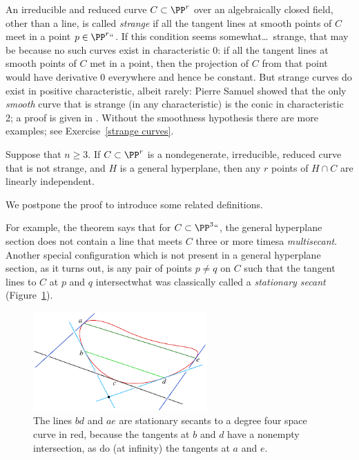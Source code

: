 An irreducible and reduced curve
$C\subset \PP^r$ over an algebraically closed field,
other than a
%
line, is called \emph{strange} if
all the tangent lines at smooth points of $C$ meet in a point $p\in \PP^r``$.
If this condition seems somewhat\dots\ strange, that may be because no
such curves exist in characteristic 0: if
all the
tangent lines at smooth points of $C$ met in a point, then the projection
of $C$ from that point would have derivative 0 everywhere and hence be
constant. But strange curves do exist in
positive
characteristic, albeit
%
rarely: Pierre Samuel showed that the only \emph{smooth} curve that is
strange (in any characteristic) is the conic in
characteristic 2;
%
a proof
is given in \cite[Theorem IV.3.9]{Hartshorne1977}. Without the smoothness
hypothesis there are more examples; see Exercise~\ref{strange curves}.



\begin{npt}
\begin{theorem}
\label{basic linear independence}\label{linear general position}
%
Suppose that $n\geq 3$. If $C\subset \PP^r$ is a nondegenerate,
irreducible, reduced curve
that is not strange,
and $H$ is a general hyperplane, then any $r$ points of $H\cap C$ are
linearly independent.
\unif
\end{theorem}
\end{npt}

We postpone the proof to introduce some related definitions.

For example, the theorem says that for $C \subset \PP^3` `$, the general
hyperplane section does not contain a line
%
that meets $C$ three or more times\emdash a \emph{multisecant}. Another
special configuration which is not present in a general hyperplane
section, as it turns out,
is any pair of points $p\neq q$ on $C$ such that the tangent lines
to $C$ at $p$ and $q$ intersect\emdash what was
classically
%
called a
\textit{stationary secant}
(Figure~\ref{Fig9.1}).

\begin{figure}
\includegraphics[height=1.5in]{main/cradle-good}
\caption{The lines $bd$ and $ae$ are stationary secants to a degree
  four space curve in red, because the tangents at $b$ and $d$
  have a nonempty intersection, as do (at infinity) the tangents at
  $a$ and $e$.}
\label{Fig9.1}
\end{figure}


